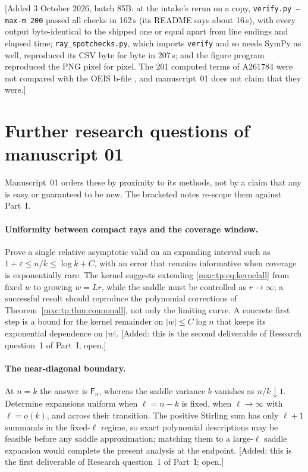 \documentclass[11pt]{article}
\numberwithin{equation}{section}
\theoremstyle{definition}
\theoremstyle{remark}
\begin{document}
[Added 3 October 2026, batch 85B: at the intake's rerun on a copy,
\texttt{verify.py --max-m 200} passed all checks in 162\,s (its README
says about 16\,s), with every output byte-identical to the shipped one or
equal apart from line endings and elapsed time;
\texttt{ray\_spotchecks.py}, which imports \texttt{verify} and so needs
SymPy as well, reproduced its CSV byte for byte in 207\,s; and the figure
program reproduced the PNG pixel for pixel. The 201 computed terms of
A261784 were not compared with the OEIS b-file \cite{oeis784b}, and manuscript~01 does not
claim that they were.]

\section{Further research questions of manuscript 01}\label{mxc:tp:sec:future}

Manuscript~01 orders these by proximity to its methods, not by a claim
that any is easy or guaranteed to be new. The bracketed notes re-scope
them against Part~I.

\paragraph{Uniformity between compact rays and the coverage window.} Prove
a single relative asymptotic valid on an expanding interval such as
$1+\varepsilon\le n/k\le\log k+C$, with an error that remains informative
when coverage is exponentially rare. The kernel suggests extending
\eqref{mxc:tp:eq:kernelall} from fixed $w$ to growing $w=Lr$, while the
saddle must be controlled as $r\to\infty$; a successful result should
reproduce the polynomial corrections of
Theorem~\ref{mxc:tp:thm:couponall}, not only the limiting curve. A
concrete first step is a bound for the kernel remainder on
$|w|\le C\log n$ that keeps its exponential dependence on $|w|$.
[Added: this is the second deliverable of Research question~1 of Part~I;
open.]

\paragraph{The near-diagonal boundary.} At $n=k$ the answer is
$\mathsf F_n$, whereas the saddle variance $b$ vanishes as
$n/k\downarrow1$. Determine expansions uniform when $\ell=n-k$ is fixed,
when $\ell\to\infty$ with $\ell=o(k)$, and across their transition. The
positive Stirling sum has only $\ell+1$ summands in the fixed-$\ell$
regime, so exact polynomial descriptions may be feasible before any
saddle approximation; matching them to a large-$\ell$ saddle expansion
would complete the present analysis at the endpoint. [Added: this is the
first deliverable of Research question~1 of Part~I; open.]
\end{document}
